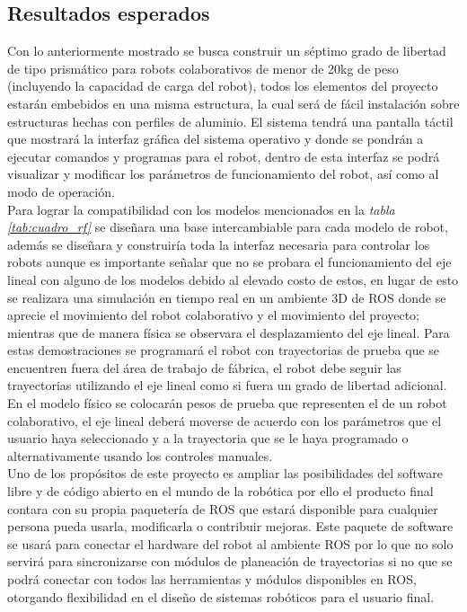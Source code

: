 \subsection{Resultados esperados}
Con lo anteriormente mostrado se busca construir un séptimo grado de libertad de tipo prismático para robots colaborativos de menor de 20kg de peso (incluyendo la capacidad de carga del robot), todos los elementos del proyecto estarán embebidos en una misma estructura, la cual será de fácil instalación sobre estructuras hechas con perfiles de aluminio. El sistema tendrá una pantalla táctil que mostrará la interfaz gráfica del sistema operativo y donde se pondrán a ejecutar comandos y programas para el robot, dentro de esta interfaz se podrá visualizar y modificar los parámetros de funcionamiento del robot, así como al modo de operación.\\
Para lograr la compatibilidad con los modelos mencionados en la \textit{tabla \ref{tab:cuadro_rf}} se diseñara una base intercambiable para cada modelo de robot, además se diseñara y construiría toda la interfaz necesaria para controlar los robots aunque es importante señalar que no se probara el funcionamiento del eje lineal con alguno de los modelos debido al elevado costo de estos, en lugar de esto se realizara una simulación en tiempo real en un ambiente 3D de ROS donde se aprecie el movimiento del robot colaborativo y el movimiento del proyecto; mientras que de manera física se observara el desplazamiento del eje lineal. Para estas demostraciones se programará el robot con trayectorias de prueba que se encuentren fuera del área de trabajo de fábrica, el robot debe seguir las trayectorias utilizando el eje lineal como si fuera un grado de libertad adicional. En el modelo físico se colocarán pesos de prueba que representen el de un robot colaborativo, el eje lineal deberá moverse de acuerdo con los parámetros que el usuario haya seleccionado y a la trayectoria que se le haya programado o alternativamente usando los controles manuales.\\
Uno de los propósitos de este proyecto es ampliar las posibilidades del software libre y de código abierto en el mundo de la robótica por ello el producto final contara con su propia paquetería de ROS que estará disponible para cualquier persona pueda usarla, modificarla o contribuir mejoras. Este paquete de software se usará para conectar el hardware del robot al ambiente ROS por lo que no solo servirá para sincronizarse con módulos de planeación de trayectorias si no que se podrá conectar con todos las herramientas y módulos disponibles en ROS, otorgando flexibilidad en el diseño de sistemas robóticos para el usuario final.\\

